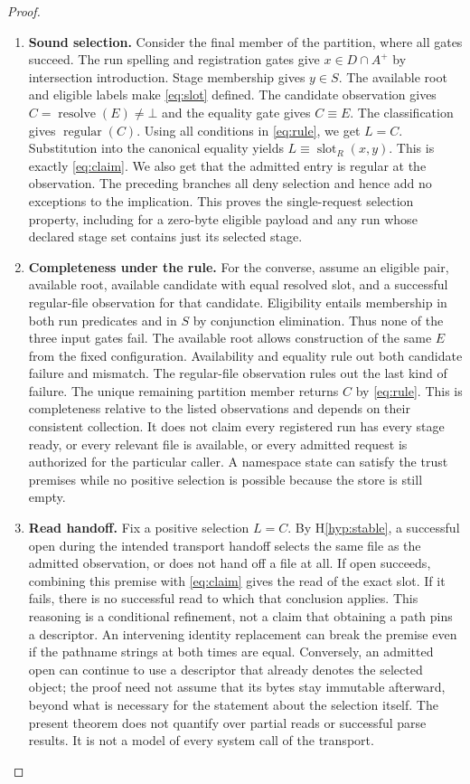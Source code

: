 \documentclass[12pt]{article}
\newcommand{\denied}{\bot}
\newcommand{\regular}{\operatorname{regular}}
\newcommand{\slot}{\operatorname{slot}}
\newcommand{\resolve}{\operatorname{resolve}}
\begin{document}
\begin{proof}
\begin{enumerate}
\item \textbf{Sound selection.}
Consider the final member of the partition, where all gates succeed.
The run spelling and registration gates give $x\in D\cap A^+$ by
intersection introduction. Stage membership gives $y\in S$.
The available root and eligible labels make \eqref{eq:slot} defined.
The candidate observation gives $C=\resolve(E)\ne\denied$ and
the equality gate gives $C\equiv E$.
The classification gives $\regular(C)$.
Using all conditions in \eqref{eq:rule}, we get $L=C$.
Substitution into the canonical equality yields
$L\equiv\slot_R(x,y)$. This is exactly \eqref{eq:claim}.
We also get that the admitted entry is regular at the observation.
The preceding branches all deny selection and hence add no exceptions
to the implication. This proves the single-request selection
property, including for a zero-byte eligible payload and any run
whose declared stage set contains just its selected stage.

\item \textbf{Completeness under the rule.}
For the converse, assume an eligible pair, available root, available
candidate with equal resolved slot, and a successful regular-file
observation for that candidate. Eligibility entails membership in
both run predicates and in $S$ by conjunction elimination.
Thus none of the three input gates fail. The available root allows
construction of the same $E$ from the fixed configuration.
Availability and equality rule out both candidate failure and mismatch.
The regular-file observation rules out the last kind of failure.
The unique remaining partition member returns $C$ by
\eqref{eq:rule}. This is completeness relative to the listed observations
and depends on their consistent collection. It does not claim every
registered run has every stage ready, or every relevant file is
available, or every admitted request is authorized for the particular
caller. A namespace state can satisfy the trust premises while no
positive selection is possible because the store is still empty.

\item \textbf{Read handoff.}
Fix a positive selection $L=C$. By H\ref{hyp:stable}, a successful
open during the intended transport handoff selects the same file
as the admitted observation, or does not hand off a file at all.
If open succeeds, combining this premise with \eqref{eq:claim}
gives the read of the exact slot. If it fails, there is no successful
read to which that conclusion applies. This reasoning is a
conditional refinement, not a claim that obtaining a path pins a
descriptor. An intervening identity replacement can break the
premise even if the pathname strings at both times are equal.
Conversely, an admitted open can continue to use a descriptor that
already denotes the selected object; the proof need not assume
that its bytes stay immutable afterward, beyond what is necessary
for the statement about the selection itself. The present theorem
does not quantify over partial reads or successful parse results.
It is not a model of every system call of the transport.


\end{enumerate}
\end{proof}
\end{document}
